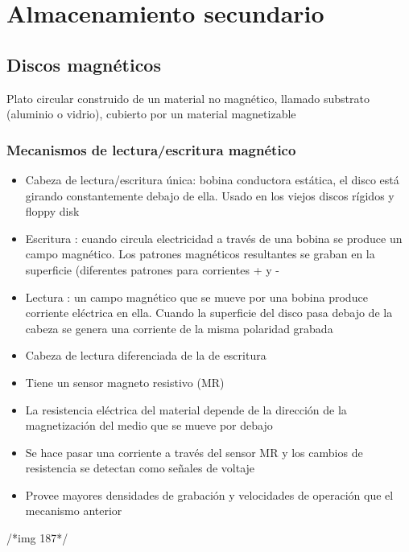 \section{Almacenamiento secundario}

\subsection{Discos magnéticos}
Plato circular construido de un material no magnético,
llamado substrato (aluminio o vidrio), cubierto por un
material magnetizable

\subsubsection{Mecanismos de lectura/escritura magnético}
\begin{itemize}
\item Cabeza de lectura/escritura única: bobina conductora estática, el disco está girando constantemente debajo de ella. Usado en los viejos discos rígidos y floppy disk
\item Escritura : cuando circula electricidad a través de una bobina se produce un campo magnético. Los patrones magnéticos resultantes se graban en la superficie (diferentes patrones para corrientes + y - 
\item Lectura : un campo magnético que se mueve por una bobina produce corriente eléctrica en ella. Cuando la superficie del disco pasa debajo de la cabeza se genera una corriente de la misma polaridad grabada
\item Cabeza de lectura diferenciada de la de escritura
\item Tiene un sensor magneto resistivo (MR)
\item La resistencia eléctrica del material depende de la dirección de la magnetización del medio que se mueve por debajo
\item Se hace pasar una corriente a través del sensor MR y los cambios de resistencia se detectan como señales de voltaje
\item Provee mayores densidades de grabación y velocidades de operación que el mecanismo anterior
\end{itemize}
/*img 187*/

